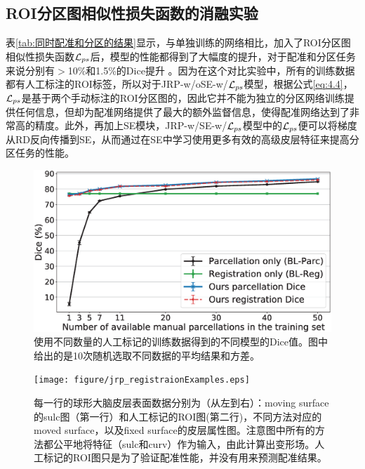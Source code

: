 \subsection{ROI分区图相似性损失函数的消融实验}
表\ref{tab:同时配准和分区的结果}显示，与单独训练的网络相比，加入了ROI分区图相似性损失函数${\cal L}_{ps}$后，模型的性能都得到了大幅度的提升，对于配准和分区任务来说分别有$>$10\%和1.5\%的Dice提升 。因为在这个对比实验中，所有的训练数据都有人工标注的ROI标签，所以对于JRP-w/oSE-w/${\cal L}_{ps}$模型，根据公式\ref{eq:4.4}，${\cal L}_{ps}$是基于两个手动标注的ROI分区图的，因此它并不能为独立的分区网络训练提供任何信息，但却为配准网络提供了最大的额外监督信息，使得配准网络达到了非常高的精度。此外，再加上SE模块，JRP-w/SE-w/${\cal L}_{ps}$模型中的${\cal L}_{ps}$便可以将梯度从RD反向传播到SE，从而通过在SE中学习使用更多有效的高级皮层特征来提高分区任务的性能。


\begin{figure}[t]
	\centering
	\includegraphics[width=0.7\linewidth]{figure/jrp_Figure_dice.eps}
	\caption{使用不同数量的人工标记的训练数据得到的不同模型的Dice值。图中给出的是10次随机选取不同数据的平均结果和方差。} \label{fig:jrp_dice}
\end{figure}

\begin{figure}[t]
	\centering
	\texttt{[image: figure/jrp\_registraionExamples.eps]}
	\caption{每一行的球形大脑皮层表面数据分别为（从左到右）：moving surface的sulc图（第一行）和人工标记的ROI图(第二行)，不同方法对应的moved surface，以及fixed surface的皮层属性图。注意图中所有的方法都公平地将特征（sulc和curv）作为输入，由此计算出变形场。人工标记的ROI图只是为了验证配准性能，并没有用来预测配准结果。} \label{fig:jrp_registraionExamples}
\end{figure}

